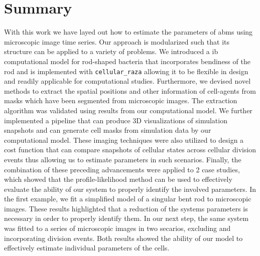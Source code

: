 
\section{Summary}

With this work we have layed out how to estimate the parameters of \acp{abm} using
microscopic image time series.
Our approach is modularized such that its structure can be applied to a variety of problems.
We introduced a \ac{ib} computational model for rod-shaped bacteria that incorporates
bendiness of
the rod and is implemented with \texttt{cellular\_raza} allowing it to be flexible in design and
readily applicable for computational studies.
Furthermore, we devised novel methods to extract the spatial positions and other information of
cell-agents from masks which have been segmented from microscopic images.
The extraction algorithm was validated using results from our computational model.
We further implemented a pipeline that can produce 3D visualizations of simulation
snapshots and can
generate cell masks from simulation data by our computational model.
These imaging techniques were also utilized to design a cost function that can compare snapshots
of cellular states across cellular division events thus allowing us to estimate
parameters in such
scenarios.
Finally, the combination of these preceding advancements were applied to 2 case
studies, which showed
that the profile-likelihood method can be used to effectively evaluate the ability of
our system to
properly identify the involved parameters.
In the first example, we fit a simplified model of a singular bent rod to microscopic images.
These results highlighted that a reduction of the systems parameters is necessary in order to
properly identify them.
In our next step, the same system was fitted to a series of microscopic images in two secarios,
excluding and incorporating division events.
Both results showed the ability of our model to effectively estimate individual
parameters of the
cells.

